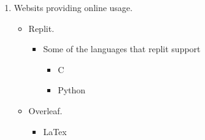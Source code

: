 \documentclass[a4paper,11pt]{report}
\begin{document}
\begin{enumerate}
\begin{enumerate}
\begin{itemize}
\begin{itemize}
                             
                         \end{itemize}
                 \end{itemize}
        \item Websits providing online usage.
             \begin{itemize}
                 \item Replit.
                 \begin{itemize}
                 \item Some of the languages that replit support
                 \begin{itemize}
                             \item C
                             \item Python
                         \end{itemize}
                         \end{itemize}
                 \item Overleaf.
                 \begin{itemize}
                             \item LaTex
                             
                         \end{itemize}
             \end{itemize}
\end{enumerate}
\end{enumerate}
\end{document}
